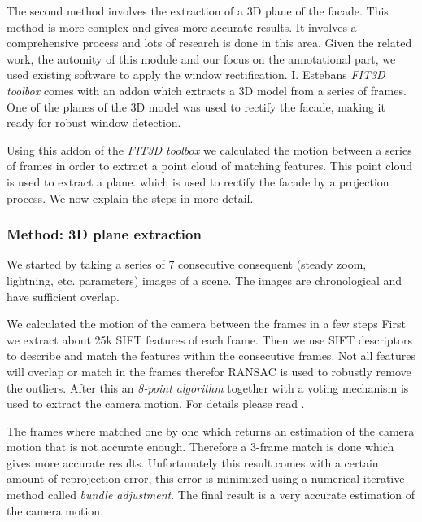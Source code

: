 The second method involves the extraction of a 3D plane of the facade. This 
method is more complex and gives more accurate results. It involves a
comprehensive process and lots of research is done in this area. 
Given the related work, the automity of this module and our focus on the annotational part,
we used existing software to apply the window rectification.
I. Estebans \emph{FIT3D toolbox} \cite{Fit3d} comes with an addon which extracts a 3D model from a
series of frames.  One of the planes of the 3D model was used to rectify the
facade, making it ready for robust window detection. 

Using this addon of the \emph{FIT3D toolbox} \cite{Fit3d} we calculated the motion between a
series of frames in order to extract a point cloud of matching features. This
point cloud is used to extract a plane.  which is used to rectify the facade by
a projection process.  We now explain the steps in more detail.

\subsubsection{Method: 3D plane extraction}
We started by taking a series of 7 consecutive consequent (steady zoom, lightning, etc. parameters) images of a scene.
The images are chronological and have sufficient overlap. 


We calculated the motion of the camera between the frames in a few steps
First we extract about 25k SIFT features of each frame.  Then we use
SIFT descriptors to describe and match the features within the consecutive
frames.  Not all features will overlap or match in the frames therefor RANSAC is used to
robustly remove the outliers.  After this an \emph{8-point algorithm} together with a
voting mechanism is used to extract the camera motion. For details please read
\cite{Fit3d}.

The frames where matched one by one which returns an estimation of the camera
motion that is not accurate enough.  Therefore a 3-frame match is done which
gives more accurate results.  Unfortunately this result comes with a certain
amount of reprojection error, this error is minimized using a numerical
iterative method called \emph{bundle adjustment}.  The final result is a very
accurate estimation of the camera motion.

